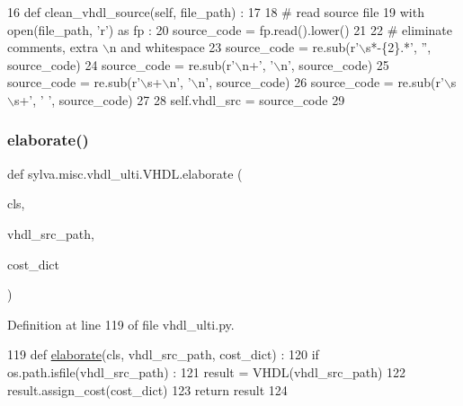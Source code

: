 \begin{DoxyCode}
16   \textcolor{keyword}{def }clean\_vhdl\_source(self, file\_path) :
17 
18     \textcolor{comment}{# read source file}
19     with open(file\_path, \textcolor{stringliteral}{'r') as fp :}
20 \textcolor{stringliteral}{      source\_code = fp.read().lower()}
21 \textcolor{stringliteral}{}
22 \textcolor{stringliteral}{    }\textcolor{comment}{# eliminate comments, extra \(\backslash\)n and whitespace}
23     source\_code = re.sub(\textcolor{stringliteral}{r'\(\backslash\)s*-\{2\}.*'}, \textcolor{stringliteral}{''}, source\_code)
24     source\_code = re.sub(\textcolor{stringliteral}{r'\(\backslash\)n+'}, \textcolor{stringliteral}{'\(\backslash\)n'}, source\_code)
25     source\_code = re.sub(\textcolor{stringliteral}{r'\(\backslash\)s+\(\backslash\)n'}, \textcolor{stringliteral}{'\(\backslash\)n'}, source\_code)
26     source\_code = re.sub(\textcolor{stringliteral}{r'\(\backslash\)s\(\backslash\)s+'}, \textcolor{stringliteral}{' '}, source\_code)
27 
28     self.vhdl\_src = source\_code
29 
\end{DoxyCode}
\mbox{\label{classsylva_1_1misc_1_1vhdl__ulti_1_1_v_h_d_l_a4e4bd98f12b587f047259934db24a2b2}} 
\subsubsection{\texorpdfstring{elaborate()}{elaborate()}}
{\footnotesize\ttfamily def sylva.\+misc.\+vhdl\+\_\+ulti.\+V\+H\+D\+L.\+elaborate (\begin{DoxyParamCaption}\item[{}]{cls,  }\item[{}]{vhdl\+\_\+src\+\_\+path,  }\item[{}]{cost\+\_\+dict }\end{DoxyParamCaption})}



Definition at line 119 of file vhdl\+\_\+ulti.\+py.


\begin{DoxyCode}
119   \textcolor{keyword}{def }\hyperlink{namespacesylva_1_1frontend_1_1simulink2sdf_a65e70cbcdade6118914d5c16f96ae56c}{elaborate}(cls, vhdl\_src\_path, cost\_dict) :
120     \textcolor{keywordflow}{if} os.path.isfile(vhdl\_src\_path) :
121       result = VHDL(vhdl\_src\_path)
122       result.assign\_cost(cost\_dict)
123     \textcolor{keywordflow}{return} result
124 
\end{DoxyCode}
\mbox{\label{classsylva_1_1misc_1_1vhdl__ulti_1_1_v_h_d_l_ad90cd226a1be4574ec7fe86b84f9e959}} 
